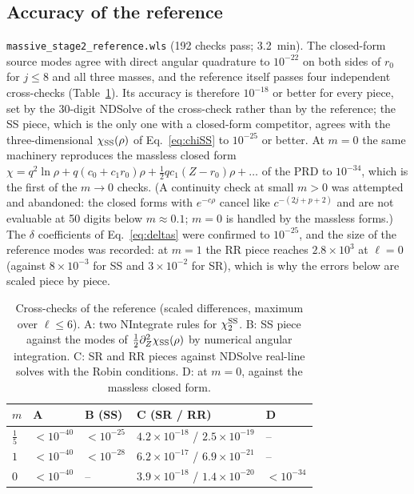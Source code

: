 \documentclass[11pt,a4paper]{article}
\newcommand{\code}[1]{\texttt{#1}}
\begin{document}
\subsection{Accuracy of the reference}\label{sec:refchecks}
\code{massive\_stage2\_\allowbreak reference.wls} (192 checks pass; 3.2~min).
The closed-form source modes agree with direct angular quadrature to $10^{-22}$ on both sides of $r_0$ for $j\le8$ and all three masses, and the reference itself passes four independent cross-checks (Table~\ref{tab:ref}).
Its accuracy is therefore $10^{-18}$ or better for every piece, set by the 30-digit NDSolve of the cross-check rather than by the reference; the SS piece, which is the only one with a closed-form competitor, agrees with the three-dimensional $\chi_{\rm SS}(\rho)$ of Eq.~\eqref{eq:chiSS} to $10^{-25}$ or better.
At $m=0$ the same machinery reproduces the massless closed form $\chi=q^2\ln\rho+q(c_0+c_1r_0)\rho+\tfrac12qc_1(Z-r_0)\rho+\dots$ of the PRD to $10^{-34}$, which is the first of the $m\to0$ checks.
(A continuity check at small $m>0$ was attempted and abandoned: the closed forms with $e^{-c\rho}$ cancel like $c^{-(2j+p+2)}$ and are not evaluable at 50 digits below $m\approx0.1$; $m=0$ is handled by the massless forms.)
The $\delta$ coefficients of Eq.~\eqref{eq:deltas} were confirmed to $10^{-25}$, and the size of the reference modes was recorded: at $m=1$ the RR piece reaches $2.8\times10^3$ at $\ell=0$ (against $8\times10^{-3}$ for SS and $3\times10^{-2}$ for SR), which is why the errors below are scaled piece by piece.

\begin{table}[h]
\centering
\caption{Cross-checks of the reference (scaled differences, maximum over $\ell\le6$). A: two NIntegrate rules for $\chi_2^{\rm SS}$. B: SS piece against the modes of $\tfrac12\partial_Z^2\chi_{\rm SS}(\rho)$ by numerical angular integration. C: SR and RR pieces against NDSolve real-line solves with the Robin conditions. D: at $m=0$, against the massless closed form.}
\label{tab:ref}
\small
\begin{tabular}{lllll}
\toprule
$m$ & A & B (SS) & C (SR / RR) & D\\
\midrule
$\tfrac15$ & $<10^{-40}$ & $<10^{-25}$ & $4.2\times10^{-18}$ / $2.5\times10^{-19}$ & --\\
$1$ & $<10^{-40}$ & $<10^{-28}$ & $6.2\times10^{-17}$ / $6.9\times10^{-21}$ & --\\
$0$ & $<10^{-40}$ & -- & $3.9\times10^{-18}$ / $1.4\times10^{-20}$ & $<10^{-34}$\\
\bottomrule
\end{tabular}
\end{table}
\end{document}
